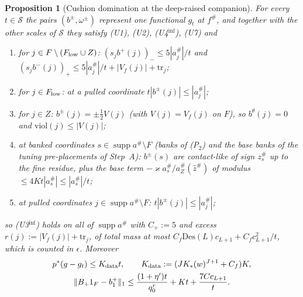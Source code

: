 \documentclass[10pt]{amsart}
\newtheorem{proposition}[theorem]{Proposition}
\theoremstyle{definition}
\theoremstyle{remark}
\newcommand{\supp}{\operatorname{supp}}
\newcommand{\zh}{\hat z}
\begin{document}
\begin{proposition}[Cushion domination at the deep-raised companion]
\label{prop:III-cushion}
For every $t\in\mathcal S$ the pairs $(b^\pm,\omega^\pm)$ represent one
functional $g_t$ at $f^\#$, and together with the other scales of $\mathcal S$
they satisfy \textup{(U1)}, \textup{(U2)}, \textup{(U4$^{\inf}$)}, \textup{(U7)} and
\begin{enumerate}
\item[(i)] for $j\in F\setminus(F_{\rm low}\cup Z)$:
$(s_jb^+(j))_-\le5|a^\#_j|/t$ and $(s_jb^-(j))_+\le5|a^\#_j|/t+|V_f(j)|+
\mathrm{tr}_j$;
\item[(ii)] for $j\in F_{\rm low}$: at a pulled coordinate $t|b^\pm(j)|\le
|a^\#_j|$;
\item[(iii)] for $j\in Z$: $b^\pm(j)=\pm\frac12V(j)$ (with $V(j)=V_f(j)$ on
$F$), so $b^\theta(j)=0$ and $\mathrm{viol}(j)\le|V(j)|$;
\item[(iv)] at banked coordinates $s\in\supp a^\#\setminus F$ \textup{(}banks
of \textup{(P$_2$)} and the base banks of the tuning pre-placements of
Step~A\textup{)}: $b^\pm(s)$ are contact-like of sign $z^\#_s$ up to the fine
residue, plus the base term $-\varkappa a^\#_s/a^\#_Z(\zh^\#)$ of modulus
$\le4Kt|a^\#_s|\le|a^\#_s|/t$;
\item[(v)] at pulled coordinates $j\in\supp a^\#\setminus F$: $t|b^\pm(j)|\le
|a^\#_j|$;
\end{enumerate}
so \textup{(U3$^{\inf}$)} holds on all of $\supp a^\#$ with $C_+:=5$ and excess
$r(j):=|V_f(j)|+\mathrm{tr}_j$, of total mass at most $C_f\mathrm{Des}(L)c_{L+1}+
C_fc_{L+1}^2/t$, which is counted in $\epsilon$.  Moreover
\begin{gather*}
 p^*(g-g_t)\le K_{\rm data}t,\qquad K_{\rm data}:=(JK_*(w)^{J+1}+C_f)K,\\
 \|B_+1_F-b^+_1\|_1\le\frac{(1+\eta')t}{q^r_0}+Kt+\frac{7Cc_{L+1}}t .
\end{gather*}
\end{proposition}
\end{document}
